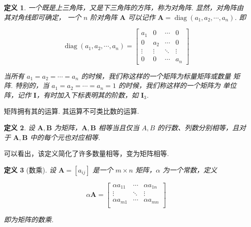\documentclass[a4paper]{article}
\newtheorem{definition}{定义}[section]
\begin{document}
\begin{definition}
    一个既是上三角阵，又是下三角阵的方阵，称为对角阵. 显然，对角阵由其对角线即可确定，
    一个 $n$ 阶对角阵 $\boldsymbol A$ 可以记作 $\boldsymbol A=\operatorname{diag}
        (a_1,a_2,\cdots,a_n)$. 即

    $$
        \operatorname{diag}(a_1,a_2,\cdots,a_n)=\begin{bmatrix}
            a_1    & 0      & \cdots & 0      \\
            0      & a_2    & \cdots & 0      \\
            \vdots & \vdots & \ddots & \vdots \\
            0      & 0      & \cdots & a_n
        \end{bmatrix}
    $$

    当所有 $a_1=a_2=\cdots=a_n$ 的时候，我们称这样的一个矩阵为标量矩阵或数量
    矩阵. 特别的，当 $a_1=a_2=\cdots=a_n=1$ 的时候，我们称这样的一个矩阵为
    单位阵，记作 $\boldsymbol I$，有时加入下标表明其的阶数，如 $\boldsymbol I_3$.
\end{definition}

矩阵拥有其的运算. 其运算不可类比数的运算.

\begin{definition}
    设 $\boldsymbol A,\boldsymbol B$ 为矩阵，$\boldsymbol A,\boldsymbol B$
    相等当且仅当 $A,B$ 的行数、列数分别相等，且对于 $\boldsymbol A,\boldsymbol B$
    中的每个元也对应相等.
\end{definition}

可以看出，该定义简化了许多数量相等，变为矩阵相等.

\begin{definition}[数乘]
    设 $\boldsymbol A=[a_{ij}]$ 是一个 $m\times n$ 矩阵，$\alpha$ 为一个常数，定义

    \begin{equation*}
        \alpha\boldsymbol A=\begin{bmatrix}
            \alpha a_{11} & \cdots & \alpha a_{1n} \\
            \vdots        & \ddots & \vdots        \\
            \alpha a_{m1} & \cdots & \alpha a_{mn} \\
        \end{bmatrix}
    \end{equation*}

    即为矩阵的数乘.
\end{definition}
\end{document}
